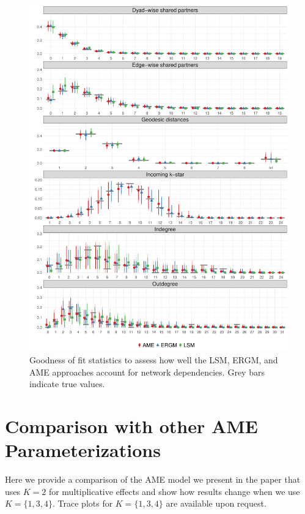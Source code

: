 \documentclass[12pt,pdflatex]{elsarticle}
\begin{document}
\begin{figure}[ht]
	\centering
	\includegraphics[width=1\textwidth]{ggGofAll}
	\caption{Goodness of fit statistics to assess how well the LSM, ERGM, and AME approaches account for network dependencies. Grey bars indicate true values.}
	\label{fig:gofAll}
\end{figure}
\FloatBarrier

\clearpage
\section*{Comparison with other AME Parameterizations}
\label{sec:ameVsAmeAppendix}

Here we provide a comparison of the AME model we present in the paper that uses $K=2$ for multiplicative effects and show how results change when we use $K=\{1,3,4\}$. Trace plots for $K=\{1,3,4\}$ are available upon request.
\end{document}
